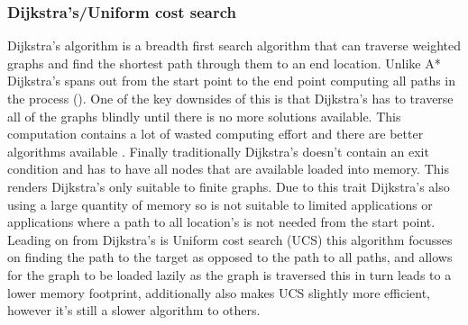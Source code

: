 \subsubsection{Dijkstra's/Uniform cost search}
Dijkstra’s algorithm is a breadth first search algorithm that can traverse weighted graphs and find the shortest path through them to an end location. Unlike A* Dijkstra’s spans out from the start point to the end point computing all paths in the process (\cite{felner_2011_position}). One of the key downsides of this is that Dijkstra’s has to traverse all of the graphs blindly until there is no more solutions available. This computation contains a lot of wasted computing effort and there are better algorithms available \cite{felner_2011_position}. Finally traditionally Dijkstra's doesn't contain an exit condition and has to have all nodes that are available loaded into memory. This renders Dijkstra's only suitable to finite graphs. Due to this trait Dijkstra's also using a large quantity of memory so is not suitable to limited applications or applications where a path to all location's is not needed from the start point.\\
Leading on from Dijkstra's is Uniform cost search (UCS) this algorithm focusses on finding the path to the target as opposed to the path to all paths, and allows for the graph to be loaded lazily as the graph is traversed this in turn leads to a lower memory footprint, additionally also makes UCS slightly more efficient, however it's still a slower algorithm to others.